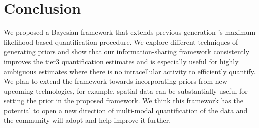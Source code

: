 \section{Conclusion}
We proposed a Bayesian framework that extends previous generation \alevin 's maximum likelihood-based 
quantification procedure. We explore different techniques of generating priors and show that our 
information-sharing framework consistently improves the tier3 \dscrnaseq quantification estimates and 
is especially useful for highly ambiguous estimates where there is no intracellular activity to 
efficiently quantify. We plan to extend the framework towards incorporating priors from new upcoming 
technologies, for example, spatial data can be substantially useful for setting the prior in the proposed 
\alevin framework.  We think this framework has the potential to open a new direction of multi-modal 
quantification of the data and the community will adopt and help improve it further.
